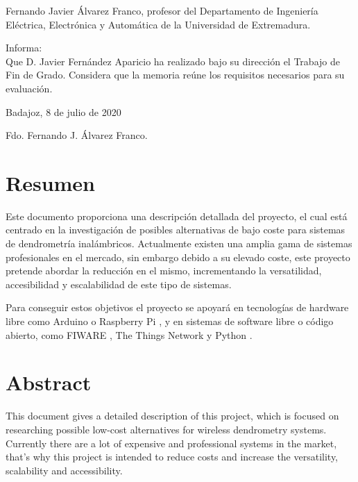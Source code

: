 \documentclass[11pt,a4paper,dvipsnames,twoside]{article}
\begin{document}
\clearpage{\pagestyle{empty}\cleardoublepage}\thispagestyle{empty}
\vspace*{\fill}
Fernando Javier Álvarez Franco, profesor del Departamento de Ingeniería Eléctrica, Electrónica y Automática de la Universidad de Extremadura.

Informa:\\ Que D. Javier Fernández Aparicio ha realizado bajo su dirección el Trabajo de Fin de Grado. Considera que la memoria reúne los requisitos necesarios para su evaluación.

\begin{center}
  Badajoz, 8 de julio de 2020
\end{center}
\vspace{2cm}
\begin{center}
  Fdo. Fernando J. Álvarez Franco.
\end{center}
\vspace*{\fill}
%

\clearpage{\pagestyle{empty}\cleardoublepage}\pagestyle{empty} %
\tableofcontents\cleardoublepage\pagestyle{myfancy} %

\clearpage{\pagestyle{empty}\cleardoublepage}\thispagestyle{plain} %
\section*{Resumen}
Este documento proporciona una descripción detallada del proyecto, el cual está centrado en la investigación de posibles alternativas de bajo coste para sistemas de dendrometría inalámbricos. Actualmente existen una amplia gama de sistemas profesionales en el mercado, sin embargo debido a su elevado coste, este proyecto pretende abordar la reducción en el mismo, incrementando la versatilidad, accesibilidad y escalabilidad de este tipo de sistemas.

Para conseguir estos objetivos el proyecto se apoyará en tecnologías de hardware libre como Arduino \cite{Arduino} o Raspberry Pi \cite{Raspberrypi}, y en sistemas de software libre o código abierto, como FIWARE \cite{FIWARE}, The Things Network \cite{TTN} y Python \cite{Python}.

\section*{Abstract}
%
This document gives a detailed description of this project, which is focused on researching possible low-cost alternatives for wireless dendrometry systems. Currently there are a lot of expensive and professional systems in the market, that's why this project is intended to reduce costs and increase the versatility, scalability and accessibility.
\end{document}
